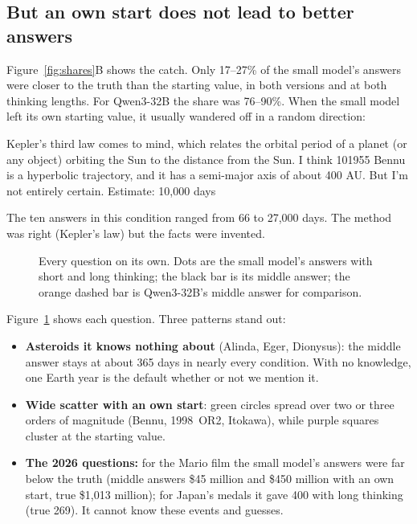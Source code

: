 \documentclass[11pt,a4paper]{article}
\begin{document}
\subsection{But an own start does not lead to better answers}

Figure~\ref{fig:shares}B shows the catch. Only 17--27\% of the small model's answers were closer to the truth than the starting value, in both versions and at both thinking lengths. For Qwen3-32B the share was 76--90\%. When the small model left its own starting value, it usually wandered off in a random direction:

\begin{transcript}
\cut{} Kepler's third law comes to mind, which relates the orbital period of a planet (or any object) orbiting the Sun to the distance from the Sun. \cut{} I think 101955 Bennu is a hyperbolic trajectory, and it has a semi-major axis of about 400 AU. But I'm not entirely certain. \cut{}
 Estimate: 10,000 days
\end{transcript}

The ten answers in this condition ranged from 66 to 27,000 days. The method was right (Kepler's law) but the facts were invented.

\begin{figure}[ht]
\centering{}
\caption{Every question on its own. Dots are the small model's answers with short and long thinking; the black bar is its middle answer; the orange dashed bar is Qwen3-32B's middle answer for comparison.}
\label{fig:items}
\end{figure}

Figure~\ref{fig:items} shows each question. Three patterns stand out:
\begin{itemize}[leftmargin=*]
  \item \textbf{Asteroids it knows nothing about} (Alinda, Eger, Dionysus): the middle answer stays at about 365 days in nearly every condition. With no knowledge, one Earth year is the default whether or not we mention it.
  \item \textbf{Wide scatter with an own start}: green circles spread over two or three orders of magnitude (Bennu, 1998~OR2, Itokawa), while purple squares cluster at the starting value.
  \item \textbf{The 2026 questions:} for the Mario film the small model's answers were far below the truth (middle answers \$45 million and \$450 million with an own start, true \$1,013 million); for Japan's medals it gave 400 with long thinking (true 269). It cannot know these events and guesses.
\end{itemize}
\end{document}
